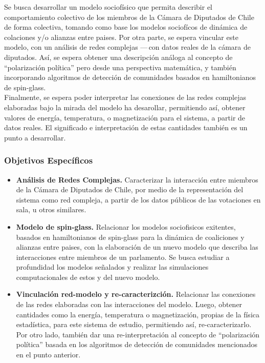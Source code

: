 \documentclass{proyectotesis}
\begin{document}
Se busca desarrollar un modelo sociofísico que permita describir el comportamiento colectivo de los miembros de la Cámara de Diputados de Chile de forma colectiva, tomando como base los modelos sociofícos de dinámica de colaciones y/o alianzas entre paises. Por otra parte, se espera vincular este modelo, con un análisis de redes complejas ---\,con datos reales de la cámara de diputados. Así, se espera obtener una descripción análoga al concepto de ``polarización política'' pero desde una perspectiva matemática, y también incorporando algoritmos de detección de comunidades basados en hamiltonianos de spin-glass. \\

Finalmente, se espera poder interpretar las conexiones de las redes complejas elaboradas bajo la mirada del modelo ha desarollar, permitiendo así, obtener valores de energía, temperatura, o magnetización para el sistema, a partir de datos reales. El significado e interpretación de estas cantidades también es un punto a desarrollar.

\subsubsection*{Objetivos Específicos}
\begin{itemize}
\item    {\bf Análisis de Redes Complejas.} Caracterizar la interacción entre miembros de la Cámara de Diputados de Chile, por medio de la representación del sistema como red compleja, a partir de los datos públicos de las votaciones en sala, u otros similares.

\item{\bf Modelo de spin-glass.} Relacionar los modelos sociofisicos exitentes, basados en hamiltonianos de spin-glass para la dinámica de coaliciones y alianzas entre paises, con la elaboración de un nuevo modelo que describa las interacciones entre miembros de un parlamento. Se busca estudiar a profundidad los modelos señalados y realizar las simulaciones computacionales de estos y del nuevo modelo.

\item {\bf Vinculación red-modelo y re-caracterizción.} Relacionar las conexiones de las redes elaboradas con las interacciones del modelo. Luego, obtener cantidades como la energía, temperatura o magnetización, propias de la física estadística, para este sistema de estudio, permitiendo así, re-caracterizarlo. Por otro lado, también dar una re-interpretación al concepto de ``polarización política''  basada en los algoritmos de detección de comunidades mencionados en el punto anterior. 

\end{itemize}
\end{document}
